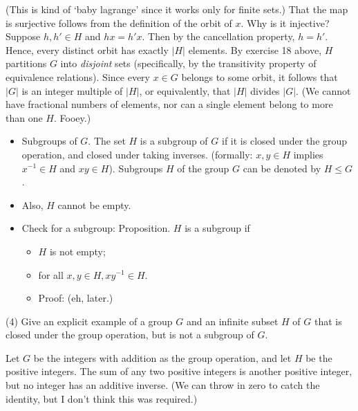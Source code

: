 \documentclass[1    0pt, answers]{exam} \renewcommand{\baselinestretch}{1.05}
\theoremstyle{plain}
\theoremstyle{definition}
\begin{document}
\begin{questions}
\begin{solution}
(This is kind of `baby lagrange' since it works only for finite sets.)
That the map is surjective follows from the definition of the orbit of $x$. Why is it injective? Suppose $h, h' \in H$ and $hx = h'x$. Then by the cancellation property, $h = h'$. Hence, every distinct orbit has exactly $|H|$ elements.
By exercise 18 above, $H$ partitions $G$ into \emph{disjoint} sets (specifically, by the transitivity property of equivalence relations). Since every $x\in G$ belongs to some orbit, it follows that $|G|$ is an integer multiple of $|H|$, or equivalently, that $|H|$ divides $|G|$. (We cannot have fractional numbers of elements, nor can a single element belong to more than one $H$. Fooey.)
\end{solution}

\begin{itemize}
\item Subgroups of $G$. The set $H$ is a subgroup of $G$ if it is closed under the group operation, and closed under taking inverses. (formally: $x, y \in H$ implies $x^{-1} \in H$ and $x y \in H$). Subgroups $H$ of the group $G$ can be denoted by $H \leq G$.
\item Also, $H$ cannot be empty.
\item Check for a subgroup: Proposition. $H$ is a subgroup if
\begin{itemize}
    \item $H$ is not empty;
    \item for all $x, y \in H, xy^{-1} \in H$.
    \item Proof: (eh, later.)
\end{itemize}
\end{itemize}

\question (4) Give an explicit example of a group $G$ and an infinite subset $H$ of $G$ that is closed under the group operation, but is not a subgroup of $G$.

\begin{solution}
Let $G$ be the integers with addition as the group operation, and let $H$ be the positive integers. The sum of any two positive integers is another positive integer, but no integer has an additive inverse. (We can throw in zero to catch the identity, but I don't think this was required.)
\end{solution}


\end{questions}
\end{document}
